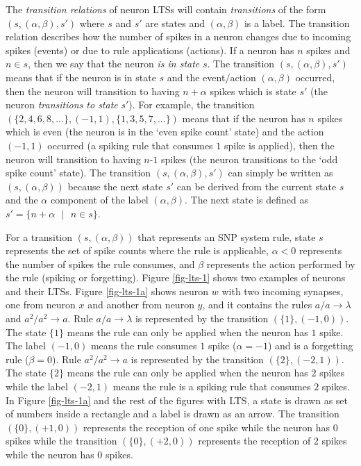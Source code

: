 \documentclass[runningheads,a4paper]{llncs}
\theoremstyle{definition}
\newcommand{\ra}{\rightarrow}
\newcommand{\se}{\text{ }}
\newcommand{\mn}{\text{-}}
\begin{document}

The \emph{transition relations} of neuron LTSs will contain \emph{transitions} of the form $(s, 
(\alpha,\beta), s')$ where $s$ and $s'$ are states and $(\alpha, \beta)$ is a label. The transition 
relation describes how the number of spikes in a neuron changes due to incoming spikes (events) or
due to rule applications (actions). If a neuron has $n$ spikes and $n \in s$, then we say that the
neuron \emph{is in state} $s$. The transition $(s,(\alpha,\beta),s')$ means that if the neuron is in
state $s$ and the event/action $(\alpha,\beta)$ occurred, then the neuron will transition to having 
$n+\alpha$ spikes which is state $s'$ (the neuron \emph{transitions to state} $s'$). For example,
the transition $(\{2,4,6,8,...\},(-1,1), \{1,3,5,7,...\})$ means that if the neuron has $n$ spikes 
which is even (the neuron is in the `even spike count' state) and the action $(-1,1)$ occurred (a 
spiking rule that consumes $1$ spike is applied), then the neuron will transition to having $n\mn 1$ 
spikes (the neuron transitions to the `odd spike count' state). The transition $(s,(\alpha,\beta),
s')$ can simply be written as $(s,(\alpha,\beta))$ because the next state $s'$ can be derived from 
the current state $s$ and the $\alpha$ component of the label $(\alpha,\beta)$. The next state is 
defined as $s'=\{n+\alpha\se|\se n \in s\}$.


For a transition $(s,(\alpha,\beta))$ that represents an SNP system rule, state $s$ represents the
set of spike counts where the rule is applicable, $\alpha<0$ represents the number of spikes the
rule consumes, and $\beta$ represents the action performed by the rule (spiking or forgetting). 
Figure \ref{fig-lts-1} shows two examples of neurons and their LTSs. Figure \ref{fig-lts-1a} shows
neuron $w$ with two incoming synapses, one from neuron $x$ and another from neuron $y$, and it 
contains the rules $a/a \ra \lambda$ and $a^2/a^2\ra a$. Rule $a/a\ra \lambda$ is represented by the 
transition $(\{1\},(-1,0))$. The state $\{1\}$ means the rule can only be applied when the neuron 
has $1$ spike. The label $(-1,0)$ means the rule consumes $1$ spike ($\alpha=-1$) and is a 
forgetting rule ($\beta = 0$). Rule $a^2/a^2\ra a$ is represented by the transition $(\{2\},
(-2,1))$. The state $\{2\}$ means the rule can only be applied when the neuron has $2$ spikes while
the label $(-2,1)$ means the rule is a spiking rule that consumes $2$ spikes. In Figure 
\ref{fig-lts-1a} and the rest of the figures with LTS, a state is drawn as set of numbers inside a
rectangle and a label is drawn as an arrow. The transition $(\{0\},(+1,0))$ represents the reception 
of one spike while the neuron has $0$ spikes while the transition $(\{0\},(+2,0))$ represents the
reception of $2$ spikes while the neuron has $0$ spikes.
\end{document}
